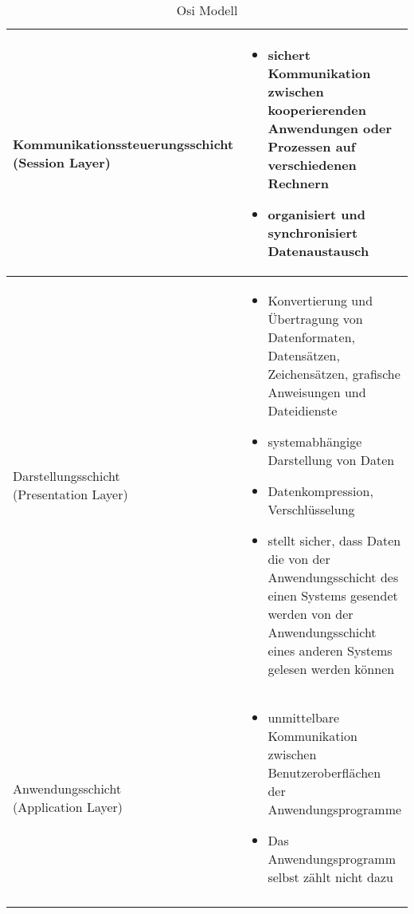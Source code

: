 \begin{longtable}[width=\textwidth]{@{}p{}@{\hspace{3em}}p{}}
    \makecell[l]{Kommunikationssteuerungsschicht \\ (Session Layer)}
        &
        \begin{itemize}
            \item sichert Kommunikation zwischen kooperierenden Anwendungen oder Prozessen auf verschiedenen Rechnern
            \item organisiert und synchronisiert Datenaustausch
        \end{itemize}
    \\\hline

    \makecell[l]{Darstellungsschicht \\ (Presentation Layer)}
        &
        \begin{itemize}
            \item Konvertierung und Übertragung von Datenformaten, Datensätzen, Zeichensätzen, grafische Anweisungen und Dateidienste
            \item systemabhängige Darstellung von Daten
            \item Datenkompression, Verschlüsselung
            \item stellt sicher, dass Daten die von der Anwendungsschicht des einen Systems gesendet werden von der Anwendungsschicht eines anderen Systems gelesen werden können
        \end{itemize}
    \\\hline

    \makecell[l]{Anwendungsschicht \\ (Application Layer)}
        &
        \begin{itemize}
            \item unmittelbare Kommunikation zwischen Benutzeroberflächen der Anwendungsprogramme
            \item Das Anwendungsprogramm selbst zählt nicht dazu
        \end{itemize}
    \\\hline
    \caption{Osi Modell}
    
\end{longtable}
